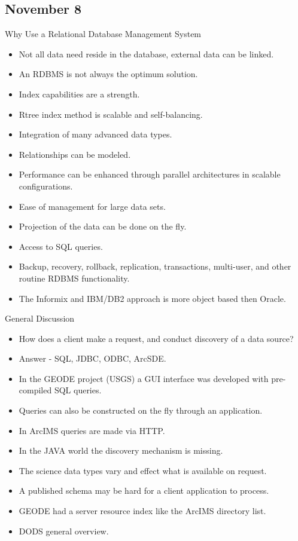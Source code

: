 \subsection{November 8}

Why Use a Relational Database Management System
 
\begin{itemize}
\item Not all data need reside in the database, external data can be linked.
\item An RDBMS is not always the optimum solution.
\item Index capabilities are a strength.
\item Rtree index method is scalable and self-balancing.
\item Integration of many advanced data types.
\item Relationships can be modeled.
\item Performance can be enhanced through parallel architectures in scalable configurations.
\item Ease of management for large data sets.
\item Projection of the data can be done on the fly.
\item Access to SQL queries.
\item Backup, recovery, rollback, replication, transactions, multi-user, and other routine 
RDBMS functionality.
\item The Informix and IBM/DB2 approach is more object based then Oracle.
\end{itemize}

        General Discussion

\begin{itemize}
\item How does a client make a request, and conduct discovery of a data source?
\item Answer - SQL, JDBC, ODBC, ArcSDE.
\item In the GEODE project (USGS) a GUI interface was developed with pre-compiled SQL 
queries.
\item Queries can also be constructed on the fly through an application.
\item In ArcIMS queries are made via HTTP.
\item In the JAVA world the discovery mechanism is missing.
\item The science data types vary and effect what is available on request.
\item A published schema may be hard for a client application to process.
\item GEODE had a server resource index like the ArcIMS directory list.
\item DODS general overview.
\end{itemize}

